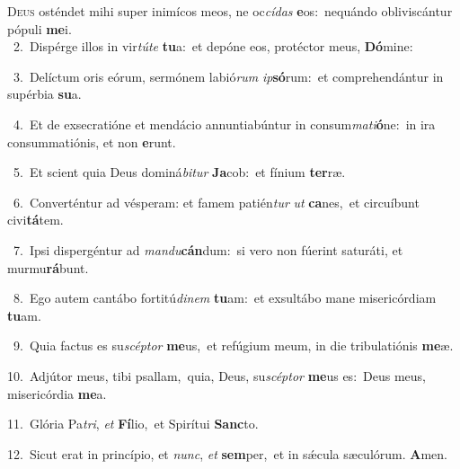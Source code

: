 \lettrine{\initial\textcolor{\initialcolor}{D}}{eus} osténdet mihi super inimícos meos, ne oc\-\textit{cí}\-\textit{das} \textbf{e}\-os:~\star nequándo obliviscántur pópuli \textbf{me}\-i.\\
{\numbfont\textcolor{\numbcolor}{~2.}}~Dispérge illos in vir\-\textit{tú}\-\textit{te} \textbf{tu}\-a:~\star et depóne eos, protéctor meus, \textbf{Dó}\-mine:\par
{\numbfont\textcolor{\numbcolor}{~3.}}~Delíctum oris eórum, sermónem labió\textit{rum} \textit{ip}\-\textbf{só}rum:~\star et comprehendántur in supérbia \textbf{su}\-a.\par
{\numbfont\textcolor{\numbcolor}{~4.}}~Et de exsecratióne et mendácio annuntiabúntur in consum\-\textit{ma}\-\textit{ti}\textbf{ó}ne:~\star in ira consummatiónis, et non \textbf{e}\-runt.\par
{\numbfont\textcolor{\numbcolor}{~5.}}~Et scient quia Deus dominá\-\textit{bi}\-\textit{tur} \textbf{Ja}\-cob:~\star et fínium \textbf{ter}\-ræ.\par
{\numbfont\textcolor{\numbcolor}{~6.}}~Converténtur ad vésperam: et famem patién\textit{tur} \textit{ut} \textbf{ca}\-nes,~\star et circuíbunt civi\-\textbf{tá}\-tem.\par
{\numbfont\textcolor{\numbcolor}{~7.}}~Ipsi dispergéntur ad \textit{man}\-\textit{du}\textbf{cán}dum:~\star si vero non fúerint saturáti, et murmu\-\textbf{rá}\-bunt.\par
{\numbfont\textcolor{\numbcolor}{~8.}}~Ego autem cantábo fortitú\-\textit{di}\-\textit{nem} \textbf{tu}\-am:~\star et exsultábo mane misericórdiam \textbf{tu}\-am.\par
{\numbfont\textcolor{\numbcolor}{~9.}}~Quia factus es su\-\textit{scép}\-\textit{tor} \textbf{me}\-us,~\star et refúgium meum, in die tribulatiónis \textbf{me}\-æ.\par
{\numbfont\textcolor{\numbcolor}{10.}}~Adjútor meus, tibi psallam,~\dagger quia, Deus, su\-\textit{scép}\-\textit{tor} \textbf{me}\-us es:~\star Deus meus, misericórdia \textbf{me}\-a.\par
{\numbfont\textcolor{\numbcolor}{11.}}~Glória Pa\-\textit{tri}\-, \textit{et} \textbf{Fí}\-lio,~\star et Spirítui \textbf{Sanc}\-to.\par
{\numbfont\textcolor{\numbcolor}{12.}}~Sicut erat in princípio, et \textit{nunc}\-, \textit{et} \textbf{sem}\-per,~\star et in sǽcula sæculórum. \textbf{A}\-men.\par
